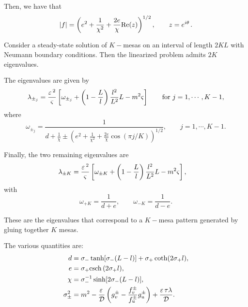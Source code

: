 Then, we have that
% 
\[
  |f| = \left(e^2 + \frac{1}{\chi^2} + \frac{2e}{\chi}\mathrm{Re}(z) \right)^{1/2},\qquad z=e^{i\theta\,}.
\]
% 

\begin{lemma}
  Consider a steady-state solution of $K-$mesas on an interval of length $2KL$ with Neumann boundary conditions. Then the linearized problem admits $2K$ eigenvalues.

The eigenvalues are given by
% 
\begin{equation*}
	\lambda_{\pm_j} = \frac{\varepsilon\,^2}{\varsigma}\left[\omega_{\pm_j} + \left(1-\frac{L}{l}\right)\frac{l^2}{L^2}L-m^2\varsigma \right]\qquad\text{for }j=1,\cdots,K-1,
\end{equation*}
% 
where
% 
\begin{equation*}
  \omega_{\pm_j}=\frac{1}{d+\frac{1}{\chi}\pm \left(e^2 + \frac{1}{\chi^2} + \frac{2e}{\chi}\cos(\pi j/K) \right)^{1/2}},\qquad j=1,\cdots,K-1.
\end{equation*}
% 

Finally, the two remaining eigenvalues are
% 
\begin{equation*}
	\begin{split}
	\begin{aligned}
	  \lambda_{\pm K} &= \frac{\varepsilon\,^2}{\varsigma}\left[\omega_{\pm K}+\left(1-\frac{L}{l}\right)\frac{l^2}{L^2}L - m^2\varsigma \right],
	\end{aligned}
	\end{split}
\end{equation*}
%
with 
% 
\[
  \omega_{+K}=\frac{1}{d+e},\qquad\omega_{-K}=\frac{1}{d-e}.
\]
% 
\end{lemma}

These are the eigenvalues that correspond to a $K-$mesa pattern generated by gluing together $K$ mesas.

The various quantities are:
% 
\begin{equation*}
	\begin{split}
	\begin{aligned}
	  d &= \sigma_-\tanh[\sigma_-(L-l)]+\sigma_+\coth(2\sigma_+l),\\
	  e &= \sigma_+\mathrm{csch} \,(2\sigma_+l),\\
	  \chi &= \sigma_-^{-1}\sinh[2\sigma_-(L-l)],\\
	  \sigma_{\pm}^2 &= m^2  - \frac{\varepsilon\,}{\mathcal{D}}\left(g_v^{\pm} - \frac{f_v^{\pm}}{f_u^{\pm}}g_u^{\pm} \right) + \frac{\varepsilon\,\tau\lambda}{\mathcal{D}}.
	\end{aligned}
	\end{split}
\end{equation*}
%

